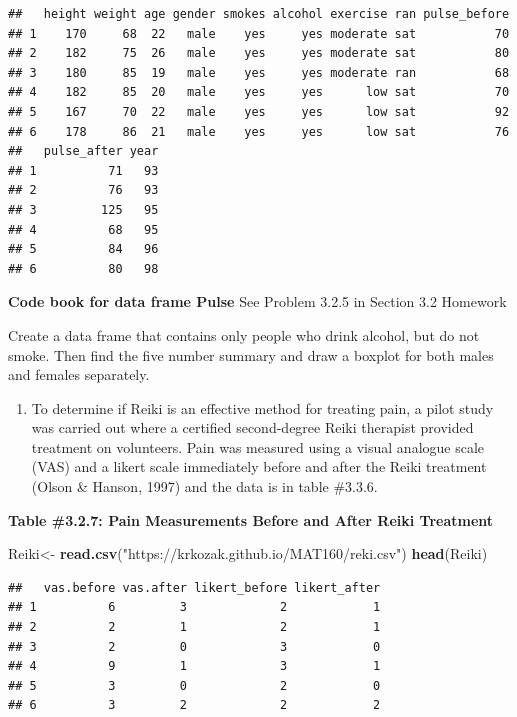 \documentclass[]{book}
\newenvironment{Shaded}{\begin{snugshade}}{\end{snugshade}}
\newcommand{\KeywordTok}[1]{\textcolor[rgb]{0.13,0.29,0.53}{\textbf{#1}}}
\newcommand{\NormalTok}[1]{#1}
\newcommand{\StringTok}[1]{\textcolor[rgb]{0.31,0.60,0.02}{#1}}
\providecommand{\tightlist}{%
  \setlength{\itemsep}{0pt}\setlength{\parskip}{0pt}}
\begin{document}
\begin{verbatim}
##   height weight age gender smokes alcohol exercise ran pulse_before
## 1    170     68  22   male    yes     yes moderate sat           70
## 2    182     75  26   male    yes     yes moderate sat           80
## 3    180     85  19   male    yes     yes moderate ran           68
## 4    182     85  20   male    yes     yes      low sat           70
## 5    167     70  22   male    yes     yes      low sat           92
## 6    178     86  21   male    yes     yes      low sat           76
##   pulse_after year
## 1          71   93
## 2          76   93
## 3         125   95
## 4          68   95
## 5          84   96
## 6          80   98
\end{verbatim}

\textbf{Code book for data frame Pulse} See Problem 3.2.5 in Section 3.2 Homework

Create a data frame that contains only people who drink alcohol, but do not smoke. Then find the five number summary and draw a boxplot for both males and females separately.

\begin{enumerate}
\def\labelenumi{\arabic{enumi}.}
\setcounter{enumi}{8}
\tightlist
\item
  To determine if Reiki is an effective method for treating pain, a pilot study was carried out where a certified second-degree Reiki therapist provided treatment on volunteers. Pain was measured using a visual analogue scale (VAS) and a likert scale immediately before and after the Reiki treatment (Olson \& Hanson, 1997) and the data is in table \#3.3.6.
\end{enumerate}

\textbf{Table \#3.2.7: Pain Measurements Before and After Reiki Treatment}

\begin{Shaded}
\begin{Highlighting}[]
\NormalTok{Reiki<-}\StringTok{ }\KeywordTok{read.csv}\NormalTok{(}\StringTok{"https://krkozak.github.io/MAT160/reki.csv"}\NormalTok{)}
\KeywordTok{head}\NormalTok{(Reiki)}
\end{Highlighting}
\end{Shaded}

\begin{verbatim}
##   vas.before vas.after likert_before likert_after
## 1          6         3             2            1
## 2          2         1             2            1
## 3          2         0             3            0
## 4          9         1             3            1
## 5          3         0             2            0
## 6          3         2             2            2
\end{verbatim}
\end{document}
